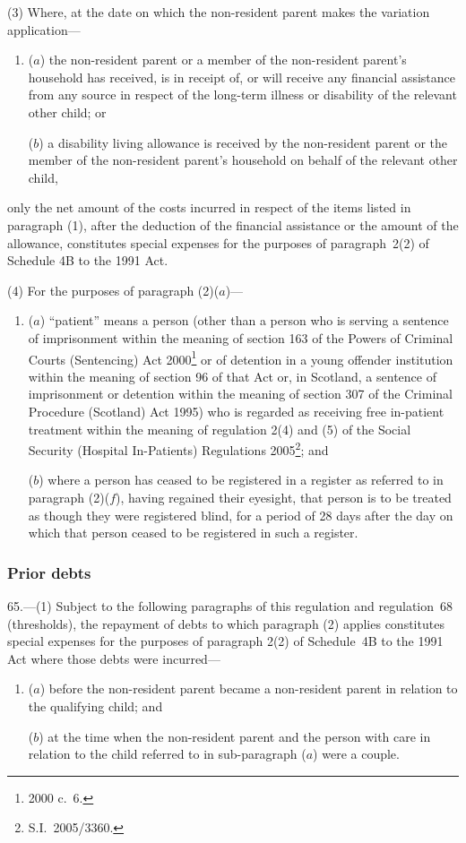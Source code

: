 \documentclass[12pt,a4paper]{article}
\begin{document}
(3) Where, at the date on which the non-resident parent makes the variation application—
\begin{enumerate}\item[]
($a$) the non-resident parent or a member of the non-resident parent’s household has received, is in receipt of, or will receive any financial assistance from any source in respect of the long-term illness or disability of the relevant other child; or

($b$) a disability living allowance is received by the non-resident parent or the member of the non-resident parent’s household on behalf of the relevant other child,
\end{enumerate}
only the net amount of the costs incurred in respect of the items listed in paragraph (1), after the deduction of the financial assistance or the amount of the allowance, constitutes special expenses for the purposes of paragraph~2(2) of Schedule 4B to the 1991 Act.

(4) For the purposes of paragraph (2)($a$)—
\begin{enumerate}\item[]
($a$) “patient” means a person (other than a person who is serving a sentence of imprisonment within the meaning of section 163 of the Powers of Criminal Courts (Sentencing) Act 2000\footnote{2000 c.~6.} or of detention in a young offender institution within the meaning of section 96 of that Act or, in Scotland, a sentence of imprisonment or detention within the meaning of section 307 of the Criminal Procedure (Scotland) Act 1995) who is regarded as receiving free in-patient treatment within the meaning of regulation 2(4) and (5) of the Social Security (Hospital In-Patients) Regulations 2005\footnote{S.I.~2005/3360.}; and

($b$) where a person has ceased to be registered in a register as referred to in paragraph (2)($f$), having regained their eyesight, that person is to be treated as though they were registered blind, for a period of 28 days after the day on which that person ceased to be registered in such a register.
\end{enumerate}

\subsubsection[65. Prior debts]{Prior debts}

65.---(1)  Subject to the following paragraphs of this regulation and regulation~68 (thresholds), the repayment of debts to which paragraph (2) applies constitutes special expenses for the purposes of paragraph 2(2) of Schedule~4B to the 1991 Act where those debts were incurred—
\begin{enumerate}\item[]
($a$) before the non-resident parent became a non-resident parent in relation to the qualifying child; and

($b$) at the time when the non-resident parent and the person with care in relation to the child referred to in sub-paragraph ($a$)  were a couple.
\end{enumerate}
\end{document}
